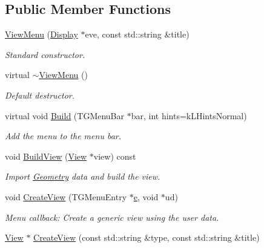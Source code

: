 \subsection*{Public Member Functions}
\begin{DoxyCompactItemize}
\item 
\hyperlink{class_d_d4hep_1_1_view_menu_a94db1dcf6c0d83d0c31f03f3817f530f}{View\+Menu} (\hyperlink{class_d_d4hep_1_1_display}{Display} $\ast$eve, const std\+::string \&title)
\begin{DoxyCompactList}\small\item\em Standard constructor. \end{DoxyCompactList}\item 
virtual \hyperlink{class_d_d4hep_1_1_view_menu_ad36eb8eac44790e3b64f1cce2c048c28}{$\sim$\+View\+Menu} ()
\begin{DoxyCompactList}\small\item\em Default destructor. \end{DoxyCompactList}\item 
virtual void \hyperlink{class_d_d4hep_1_1_view_menu_abd9d63ee3f3ca7b16a646b29e41a855c}{Build} (T\+G\+Menu\+Bar $\ast$bar, int hints=k\+L\+Hints\+Normal)
\begin{DoxyCompactList}\small\item\em Add the menu to the menu bar. \end{DoxyCompactList}\item 
void \hyperlink{class_d_d4hep_1_1_view_menu_aa100d19de078bae80eb9a434f2e2170b}{Build\+View} (\hyperlink{class_d_d4hep_1_1_view}{View} $\ast$view) const
\begin{DoxyCompactList}\small\item\em Import \hyperlink{namespace_d_d4hep_1_1_geometry}{Geometry} data and build the view. \end{DoxyCompactList}\item 
void \hyperlink{class_d_d4hep_1_1_view_menu_ad72d3a90a912cf08292c278a45701b93}{Create\+View} (T\+G\+Menu\+Entry $\ast$\hyperlink{_volumes_8cpp_a8a9a1f93e9b09afccaec215310e64142}{e}, void $\ast$ud)
\begin{DoxyCompactList}\small\item\em Menu callback\+: Create a generic view using the user data. \end{DoxyCompactList}\item 
\hyperlink{class_d_d4hep_1_1_view}{View} $\ast$ \hyperlink{class_d_d4hep_1_1_view_menu_a892a83a22a71cfaaed9dca2c8f5a3f67}{Create\+View} (const std\+::string \&type, const std\+::string \&title)

\end{DoxyCompactItemize}
